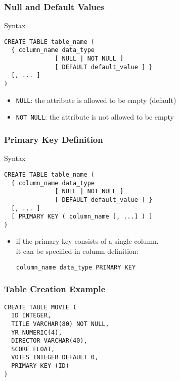 \documentclass[dvipsnames]{beamer}
\theoremstyle{plain}
\begin{document}
\begin{frame}[fragile]
  \frametitle{Null and Default Values}

  \begin{block}{Syntax}
    \begin{lstlisting}
CREATE TABLE table_name (
  { column_name data_type
              [ NULL | NOT NULL ]
              [ DEFAULT default_value ] }
  [, ... ]
)
    \end{lstlisting}
  \end{block}

  \begin{itemize}
    \item \texttt{NULL}: the attribute is allowed to be empty (default)
    \item \texttt{NOT NULL}: the attribute is not allowed to be empty
  \end{itemize}
\end{frame}

\begin{frame}[fragile]
  \frametitle{Primary Key Definition}

  \begin{block}{Syntax}
    \begin{lstlisting}
CREATE TABLE table_name (
  { column_name data_type
              [ NULL | NOT NULL ]
              [ DEFAULT default_value ] }
  [, ... ]
  [ PRIMARY KEY ( column_name [, ...] ) ]
)
    \end{lstlisting}
  \end{block}

  \begin{itemize}
    \item if the primary key consists of a single column,\\
      it can be specified in column definition:
      \begin{lstlisting}
column_name data_type PRIMARY KEY
      \end{lstlisting}
  \end{itemize}
\end{frame}

\begin{frame}[fragile]
  \frametitle{Table Creation Example}

  \begin{example}
    \begin{lstlisting}
CREATE TABLE MOVIE (
  ID INTEGER,
  TITLE VARCHAR(80) NOT NULL,
  YR NUMERIC(4),
  DIRECTOR VARCHAR(40),
  SCORE FLOAT,
  VOTES INTEGER DEFAULT 0,
  PRIMARY KEY (ID)
)
    \end{lstlisting}
  \end{example}
\end{frame}
\end{document}
